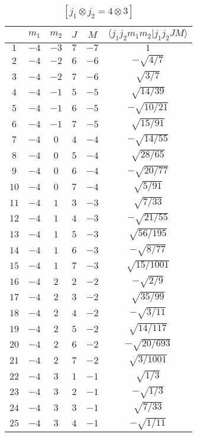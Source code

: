 \begin{table}
\tiny
\caption{$[j_1 \otimes j_2 = 4 \otimes 3]$}
\begin{center}
\begin{tabular}{|c|c|c|c|c|c|}
\hline 
   & $m_1$ & $m_2$ & $J$ & $M$ & $\langle j_1 j_2 m_1 m_2 | j_1 j_2 J M \rangle$ \\ 
\hline 
$1$ & $-4$ & $-3$ & $7$ & $-7$ & $1$ \\ 
$2$ & $-4$ & $-2$ & $6$ & $-6$ & $-\sqrt{4/7}$ \\ 
$3$ & $-4$ & $-2$ & $7$ & $-6$ & $\sqrt{3/7}$ \\ 
$4$ & $-4$ & $-1$ & $5$ & $-5$ & $\sqrt{14/39}$ \\ 
$5$ & $-4$ & $-1$ & $6$ & $-5$ & $-\sqrt{10/21}$ \\ 
$6$ & $-4$ & $-1$ & $7$ & $-5$ & $\sqrt{15/91}$ \\ 
$7$ & $-4$ & $0$ & $4$ & $-4$ & $-\sqrt{14/55}$ \\ 
$8$ & $-4$ & $0$ & $5$ & $-4$ & $\sqrt{28/65}$ \\ 
$9$ & $-4$ & $0$ & $6$ & $-4$ & $-\sqrt{20/77}$ \\ 
$10$ & $-4$ & $0$ & $7$ & $-4$ & $\sqrt{5/91}$ \\ 
$11$ & $-4$ & $1$ & $3$ & $-3$ & $\sqrt{7/33}$ \\ 
$12$ & $-4$ & $1$ & $4$ & $-3$ & $-\sqrt{21/55}$ \\ 
$13$ & $-4$ & $1$ & $5$ & $-3$ & $\sqrt{56/195}$ \\ 
$14$ & $-4$ & $1$ & $6$ & $-3$ & $-\sqrt{8/77}$ \\ 
$15$ & $-4$ & $1$ & $7$ & $-3$ & $\sqrt{15/1001}$ \\ 
$16$ & $-4$ & $2$ & $2$ & $-2$ & $-\sqrt{2/9}$ \\ 
$17$ & $-4$ & $2$ & $3$ & $-2$ & $\sqrt{35/99}$ \\ 
$18$ & $-4$ & $2$ & $4$ & $-2$ & $-\sqrt{3/11}$ \\ 
$19$ & $-4$ & $2$ & $5$ & $-2$ & $\sqrt{14/117}$ \\ 
$20$ & $-4$ & $2$ & $6$ & $-2$ & $-\sqrt{20/693}$ \\ 
$21$ & $-4$ & $2$ & $7$ & $-2$ & $\sqrt{3/1001}$ \\ 
$22$ & $-4$ & $3$ & $1$ & $-1$ & $\sqrt{1/3}$ \\ 
$23$ & $-4$ & $3$ & $2$ & $-1$ & $-\sqrt{1/3}$ \\ 
$24$ & $-4$ & $3$ & $3$ & $-1$ & $\sqrt{7/33}$ \\ 
$25$ & $-4$ & $3$ & $4$ & $-1$ & $-\sqrt{1/11}$ \\ 

\end{tabular}
\end{center}
\end{table}
